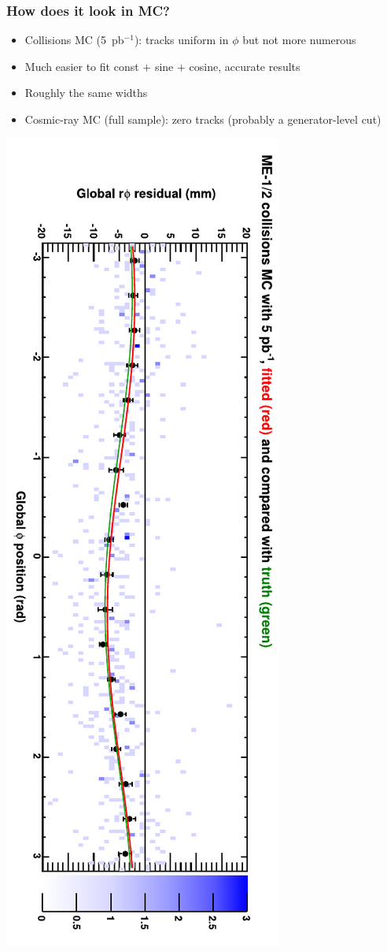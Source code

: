 \documentclass[compress]{beamer}
\begin{document}
\begin{frame}
\frametitle{How does it look in MC?}

\begin{itemize}\setlength{\itemsep}{0.25 cm}
\item Collisions MC (5~pb$^{-1}$): tracks uniform in $\phi$ but not more numerous
\item Much easier to fit const $+$ sine $+$ cosine, accurate results
\item Roughly the same widths
\item Cosmic-ray MC (full sample): zero tracks {\scriptsize (probably a generator-level cut)}
\end{itemize}

\vspace{0.5 cm}
\includegraphics[height=\linewidth, angle=90]{mccsc_example_5pb.pdf}
\end{frame}
\end{document}

